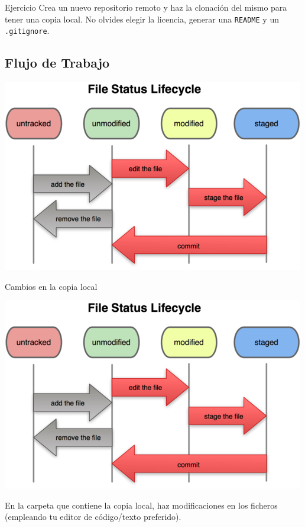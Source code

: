 \documentclass[xcolor={usenames,svgnames,dvipsnames}]{beamer}
\begin{document}
\begin{frame}[label={sec:org5933be6},fragile]{}
 \begin{block}{Ejercicio}
Crea un nuevo repositorio remoto y haz la clonación del mismo para tener una copia local. No olvides elegir la licencia, generar una \texttt{README} y un \texttt{.gitignore}.
\end{block}
\end{frame}
\subsection{Flujo de Trabajo}
\label{sec:orgc1a5890}
\begin{frame}[label={sec:orge0d17f5}]{}
\begin{center}
\includegraphics[width=.9\linewidth]{figs/git_estados.png}
\end{center}
\end{frame}

\begin{frame}[label={sec:org68d70b9}]{Cambios en la copia local}
\begin{center}
\includegraphics[height=0.4\textheight]{figs/git_estados.png}
\end{center}

En la carpeta que contiene la copia local, haz \alert{modificaciones} en los ficheros (empleando tu editor de código/texto preferido).
\end{frame}
\end{document}

